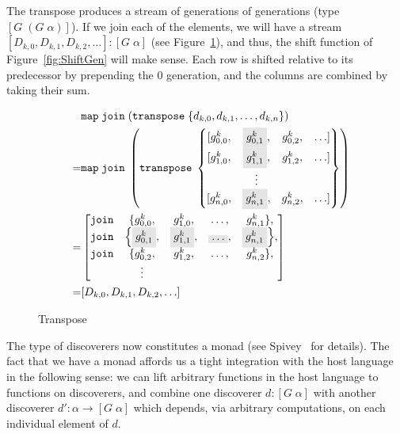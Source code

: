 The transpose produces a stream of generations of generations \linebreak(type $[G\;(G\;\alpha)]$). If we join each of the elements, we will have a stream \linebreak$[D_{k,0}, D_{k,1}, D_{k,2}, \ldots] : [G\;\alpha]$ (see Figure~\ref{fig:Transpose}), and thus, the shift function of Figure~\ref{fig:ShiftGen} will make sense. Each row is shifted relative to its predecessor by prepending the 0 generation, and the columns are combined by taking their sum.

\begin{figure}
  \begin{align*}
    &\code{map}\;\code{join}\;(\code{transpose}\;\{d_{k,0}, d_{k,1}, \ldots, d_{k,n}\})\\
  = &\code{map}\;\code{join}\;\left(\code{transpose}\;\left\{\begin{matrix}
        [g^k_{0,0}, & \colorbox{gray}{$g^k_{0,1}$}, & g^k_{0,2}, &\ldots]\\
        [g^k_{1,0}, & \colorbox{gray}{$g^k_{1,1}$}, & g^k_{1,2}, &\ldots]\\
                  & \vdots\\
        [g^k_{n,0}, & \colorbox{gray}{$g^k_{n,1}$}, & g^k_{n,2}, &\ldots]
      \end{matrix}\right\}\right)\\
      = &\left[\begin{matrix}
        \code{join}&\{g^k_{0,0}, & g^k_{1,0}, &\ldots, & g^k_{n,1}\},\\
        \code{join}&\Big\{\colorbox{gray}{$g^k_{0,1}$}, & \colorbox{gray}{$g^k_{1,1}$}, &\colorbox{gray}{$\ldots$}, & \colorbox{gray}{$g^k_{n,1}$}\Big\},\\
        \code{join}&\{g^k_{0,2}, & g^k_{1,2}, &\ldots, & g^k_{n,2}\},\\
                   & \vdots
                 \end{matrix}\right]\\
      \quad= &[D_{k,0}, D_{k,1}, D_{k,2}, \ldots]
  \end{align*}
\caption{Transpose}
\label{fig:Transpose}
\end{figure}

The type of discoverers now constitutes a monad (see Spivey~\cite{SearchAlgebras} for details). The fact that we have a monad affords us a tight integration with the host language in the following sense: we can lift arbitrary functions in the host language to functions on discoverers, and combine one discoverer $d : [G\;\alpha]$ with another discoverer $d' : \alpha \rightarrow [G\;\alpha]$ which depends, via arbitrary computations, on each individual element of $d$. 

